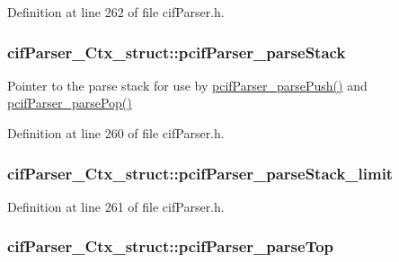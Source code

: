 Definition at line 262 of file cif\-Parser.\-h.

\hypertarget{structcif_parser___ctx__struct_a1712f4449b360f074c7660322e250fa6}{
\subsubsection[{pcif\-Parser\-\_\-parse\-Stack}]{ cif\-Parser\-\_\-\-Ctx\-\_\-struct\-::pcif\-Parser\-\_\-parse\-Stack}}\label{structcif_parser___ctx__struct_a1712f4449b360f074c7660322e250fa6}
Pointer to the parse stack for use by \hyperlink{structcif_parser___ctx__struct_a0b70618b0710af6565700ceeb51a7014}{pcif\-Parser\-\_\-parse\-Push()} and \hyperlink{cif_parser_8cpp_a180a0471bd9cd47bec5027d599275892}{pcif\-Parser\-\_\-parse\-Pop()} 

Definition at line 260 of file cif\-Parser.\-h.

\hypertarget{structcif_parser___ctx__struct_ad2ac1b7a4bf896cd9bee4fc71b72aafd}{
\subsubsection[{pcif\-Parser\-\_\-parse\-Stack\-\_\-limit}]{ cif\-Parser\-\_\-\-Ctx\-\_\-struct\-::pcif\-Parser\-\_\-parse\-Stack\-\_\-limit}}\label{structcif_parser___ctx__struct_ad2ac1b7a4bf896cd9bee4fc71b72aafd}


Definition at line 261 of file cif\-Parser.\-h.

\hypertarget{structcif_parser___ctx__struct_a76beed3021de41b81ff5736bd7b71f0b}{
\subsubsection[{pcif\-Parser\-\_\-parse\-Top}]{ cif\-Parser\-\_\-\-Ctx\-\_\-struct\-::pcif\-Parser\-\_\-parse\-Top}}\label{structcif_parser___ctx__struct_a76beed3021de41b81ff5736bd7b71f0b}


